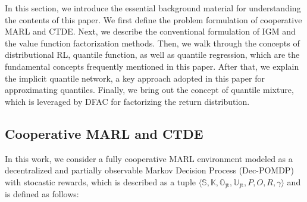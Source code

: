 \documentclass{article}
\newcommand{\statespace}{\mathbb{S}}
\newcommand{\jointactionspace}{\mathbb{U}}
\newcommand{\statetransitionfunction}{P}
\newcommand{\rewardfunction}{R}
\newcommand{\jointobservationspace}{\mathbb{O}}
\newcommand{\observationfunction}{O}
\newcommand{\agentspace}{\mathbb{K}}
\newcommand{\discountfactor}{\gamma}
\newcommand{\joint}{\mathrm{jt}}
\begin{document}
In this section, we introduce the essential background material for understanding the contents of this paper. We first define the problem formulation of cooperative MARL and CTDE. Next, we describe the conventional formulation of IGM and the value function factorization methods. Then, we walk through the concepts of distributional RL, quantile function, as well as quantile regression, which are the fundamental concepts frequently mentioned in this paper. After that, we explain the implicit quantile network, a key approach adopted in this paper for approximating quantiles.  Finally, we bring out the concept of quantile mixture, which is leveraged by DFAC for factorizing the return distribution.



\subsection{Cooperative MARL and CTDE}
\label{subsec:background_cooperative_marl_and_ctde}

In this work, we consider a fully cooperative MARL environment modeled as a decentralized and partially observable Markov Decision Process (Dec-POMDP)~\cite{Oliehoek2016DECPOMDP} with stocastic rewards, which is described as a tuple $\langle\statespace{},\agentspace{},\jointobservationspace_{\joint},\jointactionspace_{\joint},\statetransitionfunction{},\observationfunction{},\rewardfunction{},\discountfactor{}\rangle$ and is defined as follows:\\
\end{document}
